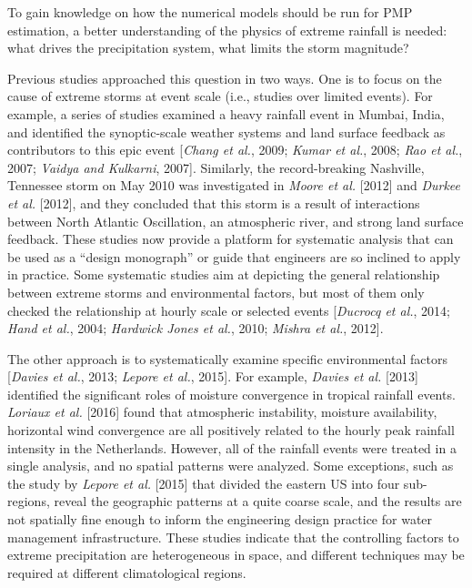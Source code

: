 To gain knowledge on how the numerical models should be run for PMP estimation, a better understanding of the physics of extreme rainfall is needed: what drives the precipitation system, what limits the storm magnitude?

Previous studies approached this question in two ways. One is to focus on the cause of extreme storms at event scale (i.e., studies over limited events). For example, a series of studies examined a heavy rainfall event in Mumbai, India, and identified the synoptic-scale weather systems and land surface feedback as contributors to this epic event [\textit{Chang et al.}, 2009; \textit{Kumar et al.}, 2008; \textit{Rao et al.}, 2007; \textit{Vaidya and Kulkarni}, 2007]. Similarly, the record-breaking Nashville, Tennessee storm on May 2010 was investigated in \textit{Moore et al.} [2012] and \textit{Durkee et al.} [2012], and they concluded that this storm is a result of interactions between North Atlantic Oscillation, an atmospheric river, and strong land surface feedback. These studies now provide a platform for systematic analysis that can be used as a ``design monograph'' or guide that engineers are so inclined to apply in practice. Some systematic studies aim at depicting the general relationship between extreme storms and environmental factors, but most of them only checked the relationship at hourly scale or selected events [\textit{Ducrocq et al.}, 2014; \textit{Hand et al.}, 2004; \textit{Hardwick Jones et al.}, 2010; \textit{Mishra et al.}, 2012].

The other approach is to systematically examine specific environmental factors [\textit{Davies et al.}, 2013; \textit{Lepore et al.}, 2015]. For example, \textit{Davies et al.} [2013] identified the significant roles of moisture convergence in tropical rainfall events. \textit{Loriaux et al.} [2016] found that atmospheric instability, moisture availability, horizontal wind convergence are all positively related to the hourly peak rainfall intensity in the Netherlands. However, all of the rainfall events were treated in a single analysis, and no spatial patterns were analyzed. Some exceptions, such as the study by \textit{Lepore et al.} [2015] that divided the eastern US into four sub-regions, reveal the geographic patterns at a quite coarse scale, and the results are not spatially fine enough to inform the engineering design practice for water management infrastructure. These studies indicate that the controlling factors to extreme precipitation are heterogeneous in space, and different techniques may be required at different climatological regions.

